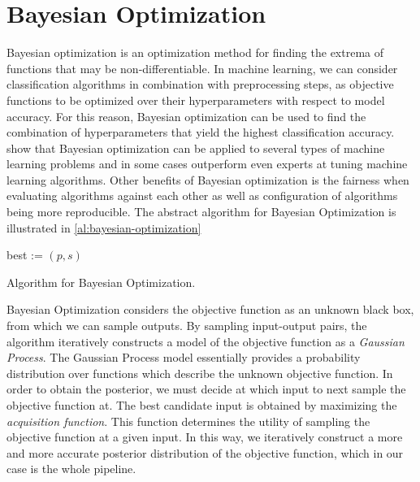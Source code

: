 \section{Bayesian Optimization}\label{sec:bayesian-optimization}
Bayesian optimization is an optimization method for finding the extrema of functions that may be non-differentiable. In machine learning, we can consider classification algorithms in combination with preprocessing steps, as objective functions to be optimized over their hyperparameters with respect to model accuracy. For this reason, Bayesian optimization can be used to find the combination of hyperparameters that yield the highest classification accuracy. \citet{snoek2012practical} show that Bayesian optimization can be applied to several types of machine learning problems and in some cases outperform even experts at tuning machine learning algorithms. Other benefits of Bayesian optimization is the fairness when evaluating algorithms against each other as well as configuration of algorithms being more reproducible.
The abstract algorithm for Bayesian Optimization is illustrated in \cref{al:bayesian-optimization}
\begin{algorithm*}
	best := $(p, s)$   
	\caption{Algorithm for Bayesian Optimization.}
	\label{al:bayesian-optimization}
\end{algorithm*}

Bayesian Optimization considers the objective function as an unknown black box, from which we can sample outputs. By sampling input-output pairs, the algorithm iteratively constructs a model of the objective function as a \emph{Gaussian Process}. The Gaussian Process model essentially provides a probability distribution over functions which describe the unknown objective function. In order to obtain the posterior, we must decide at which input to next sample the objective function at. The best candidate input is obtained by maximizing the \emph{acquisition function}. This function determines the utility of sampling the objective function at a given input. In this way, we iteratively construct a more and more accurate posterior distribution of the objective function, which in our case is the whole pipeline.

